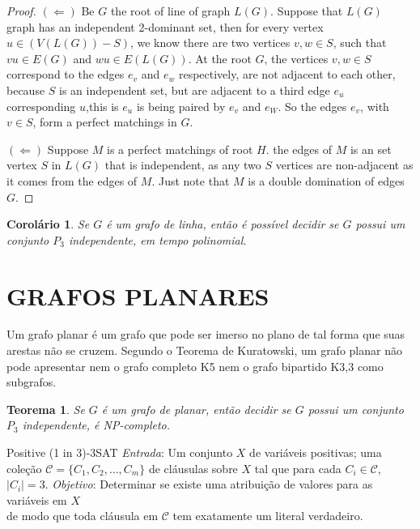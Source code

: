 \documentclass[a4paper,8pt]{article}
\theoremstyle{plain}
\newtheorem{theorem}{Teorema}[section]
\newtheorem{corollary}{Corolário}[section]
\begin{document}
\begin{proof}
$(\Longleftarrow)$ Be $G$ the root of line of graph $L(G)$. Suppose that $L(G)$ graph has an independent 2-dominant set, then for every vertex $u\in (V(L(G))-S)$, we know there are two vertices $v,w\in S$, such that $vu\in E(G)$ and $wu\in E(L(G))$. 
At the root $G$, the vertices $v,w \in S$ correspond to the edges $e_{v}$ and $e_{w}$ respectively, are not adjacent to each other, because $S$ is an independent set, but are adjacent to a third edge $e_{u}$ corresponding $u$,this is $e_{u}$ is being paired by $e_{v}$ and $e_{W}$. So the edges $e_{v}$, with $v \in S$, form a perfect matchings in $G$.


$(\Longleftarrow)$ Suppose $M$ is a perfect matchings of  root $H$. the  edges of $M$ is an set vertex $S$ in $L(G)$  that is independent, as any two $S$ vertices are non-adjacent as it comes from the edges of $M$. Just note that $M$ is a double domination of edges $G$.  










\end{proof}
\begin{corollary}
Se $G$ é um grafo de linha, então é possível decidir se $G$ possui um conjunto $P_3$ independente, em tempo polinomial. 
\end{corollary}


\section{GRAFOS PLANARES}
Um grafo planar é um grafo que pode ser imerso no plano de tal forma que suas arestas não se cruzem.  Segundo o Teorema de Kuratowski, um grafo planar não pode apresentar nem o grafo completo K5 nem o grafo bipartido K3,3 como subgrafos. 

\begin{theorem} \label{teo1}
 Se $G$ é um grafo de planar, então  decidir se $G$ possui um conjunto $P_3$ independente, é NP-completo. 
\end{theorem}



{\sc Positive (1 in 3)-3SAT}                                 
\emph{Entrada}: Um conjunto $X$ de variáveis positivas; uma coleção $\mathcal{C}=\{C_1,C_2,\ldots,C_m\}$ de cláusulas sobre  $X$ tal que para cada $C_i\in \mathcal{C}$, $|C_i|= 3$.
\emph{Objetivo}: Determinar se existe uma atribuição de valores para as variáveis em $ X $\\ de modo que toda cláusula em  $\mathcal{C}$ tem exatamente um literal verdadeiro.
\end{document}
